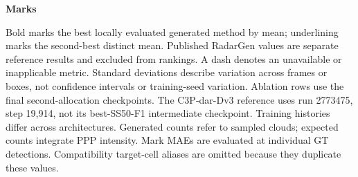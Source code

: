 \begin{table}[t]
\textbf{Marks}\par\smallskip
{}
\medskip
\smallskip
\begin{minipage}{\textwidth}
\footnotesize
Bold marks the best locally evaluated generated method by mean; underlining marks the second-best distinct mean. Published RadarGen values are separate reference results and excluded from rankings. A dash denotes an unavailable or inapplicable metric. Standard deviations describe variation across frames or boxes, not confidence intervals or training-seed variation. Ablation rows use the final second-allocation checkpoints. The C3P-dar-Dv3 reference uses run 2773475, step 19,914, not its best-SS50-F1 intermediate checkpoint. Training histories differ across architectures. Generated counts refer to sampled clouds; expected counts integrate PPP intensity. Mark MAEs are evaluated at individual GT detections. Compatibility target-cell aliases are omitted because they duplicate these values.
\end{minipage}
\end{table}

